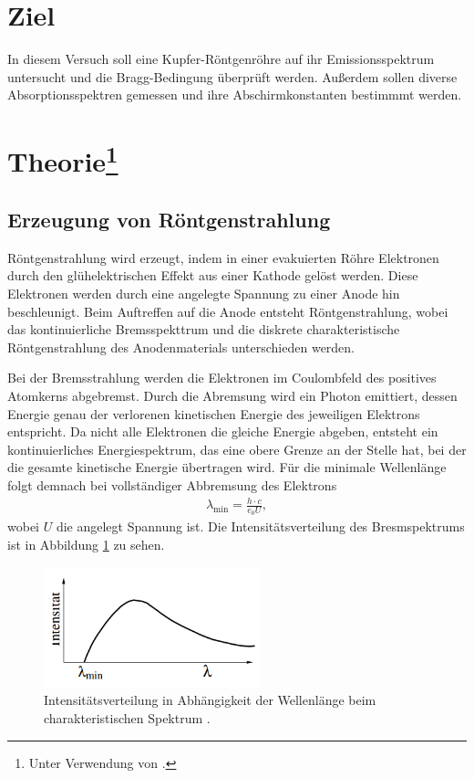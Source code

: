 \section{Ziel}
In diesem Versuch soll eine Kupfer-Röntgenröhre auf ihr Emissionsspektrum untersucht und die Bragg-Bedingung überprüft werden.
Außerdem sollen diverse Absorptionsspektren gemessen und ihre Abschirmkonstanten bestimmmt werden.


\section[Theorie]{Theorie\footnote[1]{Unter Verwendung von \cite[]{man:v602}.}}

\subsection{Erzeugung von Röntgenstrahlung}
Röntgenstrahlung wird erzeugt, indem in einer evakuierten Röhre Elektronen durch den glühelektrischen Effekt aus einer Kathode gelöst werden.
Diese Elektronen werden durch eine angelegte Spannung zu einer Anode hin beschleunigt.
Beim Auftreffen auf die Anode entsteht Röntgenstrahlung, wobei das kontinuierliche Bremsspekttrum und die diskrete charakteristische Röntgenstrahlung des Anodenmaterials unterschieden werden.

\noindent
Bei der Bremsstrahlung werden die Elektronen im Coulombfeld des positives Atomkerns abgebremst.
Durch die Abremsung wird ein Photon emittiert, dessen Energie genau der verlorenen kinetischen Energie des jeweiligen Elektrons entspricht.
Da nicht alle Elektronen die gleiche Energie abgeben, entsteht ein kontinuierliches Energiespektrum, das eine obere Grenze an der Stelle hat,
bei der die gesamte kinetische Energie übertragen wird.
Für die minimale Wellenlänge folgt demnach bei vollständiger Abbremsung des Elektrons
\begin{align}
    \lambda_\text{min} = \frac{h \cdot c}{e_0 U},
    \label{eq:wellenlaenge}
\end{align}
wobei $U$ die angelegt Spannung ist.
Die Intensitätsverteilung des Bresmspektrums ist in Abbildung \ref{fig:bremsspektrum} zu sehen.
\begin{figure}[H]
    \centering
    \includegraphics[height = 3.5cm]{Abbildungen/bremsspektrum.png}
    \caption{Intensitätsverteilung in Abhängigkeit der Wellenlänge beim charakteristischen Spektrum \cite[]{man:v602}.}
    \label{fig:bremsspektrum}
\end{figure}

